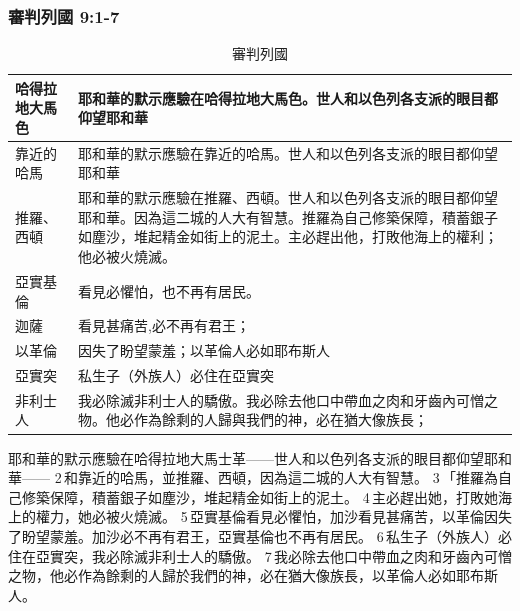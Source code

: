\subsubsection{審判列國 9:1-7}
\begin{table}[!hbp]
\centering 
\begin{tabular}{|p{3.3cm}||p{12cm}|}
\hline
\hline
哈得拉地大馬色 &耶和華的默示應驗在哈得拉地大馬色。世人和以色列各支派的眼目都仰望耶和華\\\hline
靠近的哈馬 &耶和華的默示應驗在靠近的哈馬。世人和以色列各支派的眼目都仰望耶和華\\\hline
推羅、西頓 &耶和華的默示應驗在推羅、西頓。世人和以色列各支派的眼目都仰望耶和華。因為這二城的人大有智慧。推羅為自己修築保障，積蓄銀子如塵沙，堆起精金如街上的泥土。主必趕出他，打敗他海上的權利；他必被火燒滅。\\\hline
亞實基倫& 看見必懼怕，也不再有居民。\\\hline
迦薩&看見甚痛苦,必不再有君王；\\\hline
 以革倫 &因失了盼望蒙羞；以革倫人必如耶布斯人\\\hline
 亞實突&私生子（外族人）必住在亞實突\\\hline
 非利士人&我必除滅非利士人的驕傲。我必除去他口中帶血之肉和牙齒內可憎之物。他必作為餘剩的人歸與我們的神，必在猶大像族長；\\\hline
\end{tabular}
\caption{審判列國 }
\end{table}
耶和華的默示應驗在哈得拉地大馬士革——世人和以色列各支派的眼目都仰望耶和華—— 2 和靠近的哈馬，並推羅、西頓，因為這二城的人大有智慧。 3 「推羅為自己修築保障，積蓄銀子如塵沙，堆起精金如街上的泥土。 4 主必趕出她，打敗她海上的權力，她必被火燒滅。 5 亞實基倫看見必懼怕，加沙看見甚痛苦，以革倫因失了盼望蒙羞。加沙必不再有君王，亞實基倫也不再有居民。 6 私生子（外族人）必住在亞實突，我必除滅非利士人的驕傲。 7 我必除去他口中帶血之肉和牙齒內可憎之物，他必作為餘剩的人歸於我們的神，必在猶大像族長，以革倫人必如耶布斯人。




